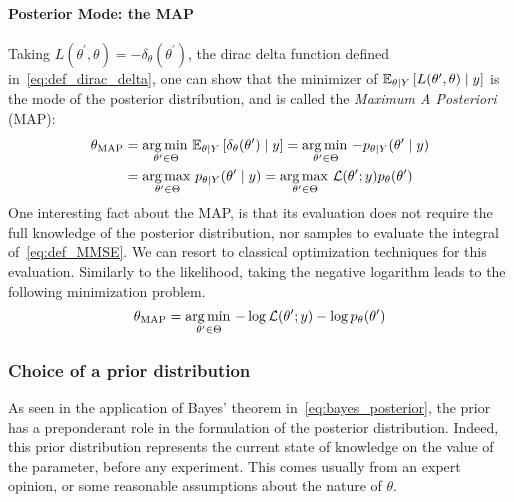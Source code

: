 \documentclass[../../Main_ManuscritThese.tex]{subfiles}
\begin{document}
\paragraph{Posterior Mode: the MAP}
Taking $L(\theta^{\prime},\theta) = -\delta_{\theta}(\theta^{\prime})$, the dirac delta function defined in~\cref{eq:def_dirac_delta}, one can show that the minimizer of $\mathbb{E}_{\theta\mid Y}\left[L(\theta^{\prime},\theta) \mid y\right]$ is the mode of the posterior distribution, and is called the \emph{Maximum A Posteriori} (MAP):
\begin{align}
  \label{eq:def_MAP}
  {\theta}_{\mathrm{MAP}} &= \operatorname*{arg\,min \,}_{\theta^{\prime} \in \Theta}\mathbb{E}_{\theta\mid Y}\left[\delta_{\theta}(\theta^{\prime})\mid y\right] = \operatorname*{arg\,min \,}_{\theta^{\prime} \in \Theta} -p_{\theta\mid Y}(\theta^{\prime}\mid y) \\
                         &= \operatorname*{arg\,max \,}_{\theta^{\prime} \in \Theta} p_{\theta\mid Y}(\theta^{\prime} \mid y) = \operatorname*{arg\,max \,}_{\theta^{\prime} \in \Theta} \mathcal{L}(\theta^{\prime} ;y)p_{\theta}(\theta^{\prime})
                           \nonumber
\end{align}
One interesting fact about the MAP, is that its evaluation does not require the full knowledge of the posterior distribution, nor samples to evaluate the integral of~\cref{eq:def_MMSE}. We can resort to classical optimization techniques for this evaluation. Similarly to the likelihood, taking the negative logarithm leads to the following minimization problem.
\begin{equation}
  \label{eq:minimisation_MAP_log}
  {\theta}_{\mathrm{MAP}} = \operatorname*{arg\,min \,}_{\theta^{\prime}\in \Theta} -\log \mathcal{L}(\theta^{\prime};y) - \log p_{\theta}(\theta^{\prime})
\end{equation}

\subsubsection{Choice of a prior distribution}
\label{sec:choice_prior}
As seen in the application of Bayes' theorem
in~\cref{eq:bayes_posterior}, the prior has a preponderant role in the
formulation of the posterior distribution. Indeed, this prior
distribution represents the current state of knowledge on the value of
the parameter, before any experiment. This comes usually from an
expert opinion, or some reasonable assumptions about the nature of
$\theta$.
\end{document}
